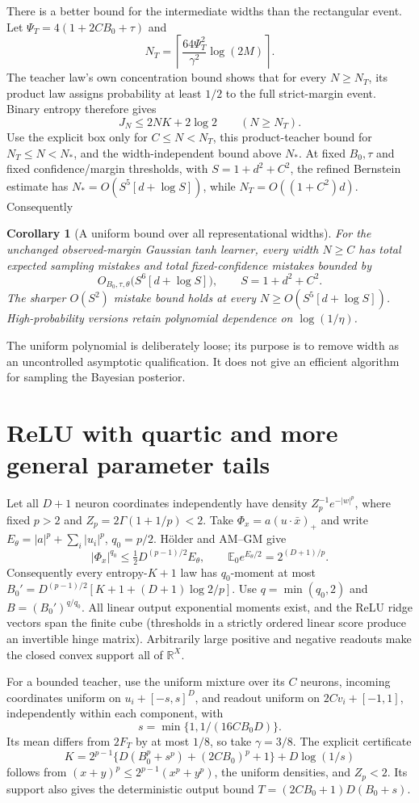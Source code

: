 \documentclass[11pt]{article}
\newtheorem{corollary}[theorem]{Corollary}
\newcommand{\E}{\mathbb E}
\newcommand{\R}{\mathbb R}
\begin{document}
There is a better bound for the intermediate widths than the rectangular
event. Let $\Psi_T=4(1+2CB_0+\tau)$ and
\[
 N_T=\left\lceil\frac{64\Psi_T^2}{\gamma^2}\log(2M)\right\rceil.
\]
The teacher law's own concentration bound shows that for every
$N\ge N_T$, its product law assigns probability at least $1/2$ to
the full strict-margin event. Binary entropy therefore gives
\[
 J_N\le2NK+2\log2\qquad(N\ge N_T).
\]
Use the explicit box only for $C\le N<N_T$, this product-teacher
bound for $N_T\le N<N_*$, and the width-independent bound above $N_*$.
At fixed $B_0,\tau$ and fixed confidence/margin thresholds, with
$S=1+d^2+C^2$, the refined Bernstein estimate has
$N_*=O(S^5[d+\log S])$, while $N_T=O((1+C^2)d)$. Consequently
\begin{corollary}[A uniform bound over all representational widths]
For the unchanged observed-margin Gaussian tanh learner, every width
$N\ge C$ has total expected sampling mistakes and total fixed-confidence
mistakes bounded by
\[
 O_{B_0,\tau,\theta}\bigl(S^6[d+\log S]\bigr),
 \qquad S=1+d^2+C^2.
\]
The sharper $O(S^2)$ mistake bound holds at every
$N\ge O(S^5[d+\log S])$. High-probability versions retain polynomial
dependence on $\log(1/\eta)$.
\end{corollary}
The uniform polynomial is deliberately loose; its purpose is to remove
width as an uncontrolled asymptotic qualification. It does not give an
efficient algorithm for sampling the Bayesian posterior.

\section{ReLU with quartic and more general parameter tails}
Let all $D+1$ neuron coordinates independently have density
$Z_p^{-1}e^{-|w|^p}$, where fixed $p>2$ and
$Z_p=2\Gamma(1+1/p)<2$. Take $\Phi_x=a(u\cdot\bar x)_+$ and write
$E_\theta=|a|^p+\sum_i|u_i|^p$, $q_0=p/2$. H\"older and AM--GM give
\[
 |\Phi_x|^{q_0}\le\tfrac12D^{(p-1)/2}E_\theta,
 \qquad \E_0e^{E_\theta/2}=2^{(D+1)/p}.
\]
Consequently every entropy-$K+1$ law has
$q_0$-moment at most
$B_0'=D^{(p-1)/2}[K+1+(D+1)\log2/p]$. Use $q=\min(q_0,2)$ and
$B=(B_0')^{q/q_0}$. All linear output exponential moments exist,
and the ReLU ridge vectors span the finite cube (thresholds in a
strictly ordered linear score produce an invertible hinge matrix).
Arbitrarily large positive and negative readouts make the closed convex
support all of $\R^X$.

For a bounded teacher, use the uniform mixture over its $C$ neurons,
incoming coordinates uniform on $u_i+[-s,s]^D$, and readout uniform
on $2Cv_i+[-1,1]$, independently within each component, with
\[
 s=\min\{1,1/(16CB_0D)\}.
\]
Its mean differs from $2F_T$ by at most $1/8$, so take $\gamma=3/8$.
The explicit certificate
\[
 K=2^{p-1}\{D(B_0^p+s^p)+(2CB_0)^p+1\}+D\log(1/s)
\]
follows from $(x+y)^p\le2^{p-1}(x^p+y^p)$, the uniform densities,
and $Z_p<2$. Its support also gives the deterministic output bound
$T=(2CB_0+1)D(B_0+s)$.
\end{document}
